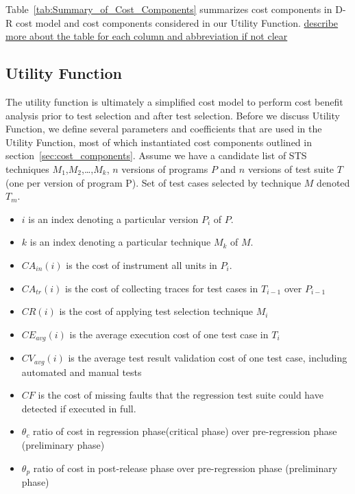 %

Table~\ref{tab:Summary_of_Cost_Components} summarizes cost components in D-R
cost model and cost components considered in our Utility Function.
\underline{describe more about the table for each column and abbreviation if
not clear}


\pagebreak

\subsection{Utility Function}\label{Utility_function}
The utility function is ultimately a simplified cost model to perform cost
benefit analysis prior to test selection and after test selection. Before we
discuss Utility Function, we define several parameters and coefficients that are
used in the Utility Function, most of which instantiated cost components outlined in section~\ref{sec:cost_components}. Assume we have a candidate list of STS techniques $M_1$,$M_2$,\ldots,$M_k$, $n$ versions of
programs $P$ and $n$ versions of test suite $T$ (one per version of program P).
Set of test cases selected by technique $M$ denoted $T_m$.
\begin{itemize}
  \item $i$ is an index denoting a particular version $P_i$ of $P$.
  \item $k$ is an index denoting a particular technique $M_k$ of $M$.
  \item $CA_{in}(i)$ is the cost of instrument all units in $P_i$.
  \item $CA_{tr}(i)$ is the cost of collecting traces for test cases in
  $T_{i-1}$ over $P_{i-1}$ 
  \item $CR(i)$ is the cost of applying test selection technique $M_i$
  \item $CE_{avg}(i)$ is the average execution cost of one test case in $T_i$
  \item $CV_{avg}(i)$ is the average test result validation cost of one test
  case, including automated and manual tests
  \item $CF$ is the cost of missing faults that the regression test suite
  could have detected if executed in full.
  \item $\theta_c$ ratio of cost in regression phase(critical phase) over
  pre-regression phase (preliminary phase)
  \item $\theta_p$ ratio of cost in post-release phase over pre-regression phase
  (preliminary phase)
   
\end{itemize}

